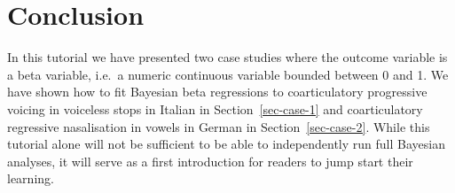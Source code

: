 \documentclass[
  authoryear,
  preprint,
  3p]{elsarticle}
\begin{document}
\section{Conclusion}\label{conclusion}

In this tutorial we have presented two case studies where the outcome
variable is a beta variable, i.e.~a numeric continuous variable bounded
between 0 and 1. We have shown how to fit Bayesian beta regressions to
coarticulatory progressive voicing in voiceless stops in Italian in
Section~\ref{sec-case-1} and coarticulatory regressive nasalisation in
vowels in German in Section~\ref{sec-case-2}. While this tutorial alone
will not be sufficient to be able to independently run full Bayesian
analyses, it will serve as a first introduction for readers to jump
start their learning.


  
\end{document}
